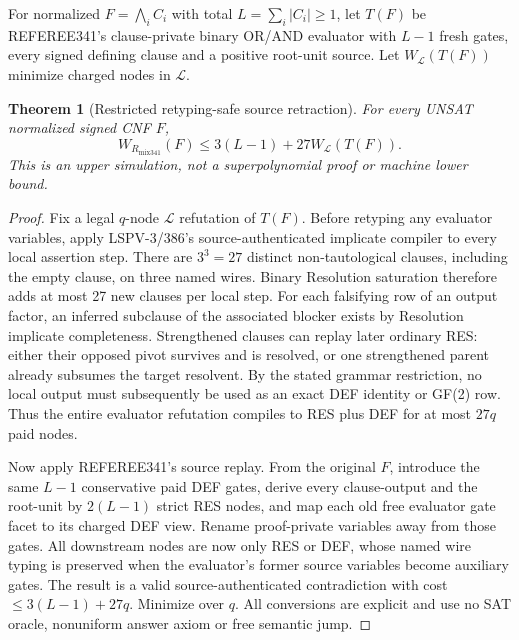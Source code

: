 \documentclass[11pt]{article}
\newtheorem{theorem}{Theorem}
\begin{document}
For normalized \(F=\bigwedge_i C_i\) with total \(L=\sum_i|C_i|\ge1\), let \(T(F)\) be REFEREE341's clause-private binary OR/AND evaluator with \(L-1\) fresh gates, every signed defining clause and a positive root-unit source. Let \(W_{\mathcal L}(T(F))\) minimize charged nodes in \(\mathcal L\).
\begin{theorem}[Restricted retyping-safe source retraction]
For every UNSAT normalized signed CNF \(F\),
\[
 \boxed{W_{R_{\mathrm{mix341}}}(F)\le3(L-1)+27W_{\mathcal L}(T(F)).}
\]
This is an upper simulation, not a superpolynomial proof or machine lower bound.
\end{theorem}
\begin{proof}
Fix a legal \(q\)-node \(\mathcal L\) refutation of \(T(F)\). Before retyping any evaluator variables, apply LSPV-3/386's source-authenticated implicate compiler to every local assertion step. There are \(3^3=27\) distinct non-tautological clauses, including the empty clause, on three named wires. Binary Resolution saturation therefore adds at most 27 new clauses per local step. For each falsifying row of an output factor, an inferred subclause of the associated blocker exists by Resolution implicate completeness. Strengthened clauses can replay later ordinary RES: either their opposed pivot survives and is resolved, or one strengthened parent already subsumes the target resolvent. By the stated grammar restriction, no local output must subsequently be used as an exact DEF identity or GF(2) row. Thus the entire evaluator refutation compiles to RES plus DEF for at most \(27q\) paid nodes.

Now apply REFEREE341's source replay. From the original \(F\), introduce the same \(L-1\) conservative paid DEF gates, derive every clause-output and the root-unit by \(2(L-1)\) strict RES nodes, and map each old free evaluator gate facet to its charged DEF view. Rename proof-private variables away from those gates. All downstream nodes are now only RES or DEF, whose named wire typing is preserved when the evaluator's former source variables become auxiliary gates. The result is a valid source-authenticated contradiction with cost \(\le3(L-1)+27q\). Minimize over \(q\). All conversions are explicit and use no SAT oracle, nonuniform answer axiom or free semantic jump.
\end{proof}
\end{document}
